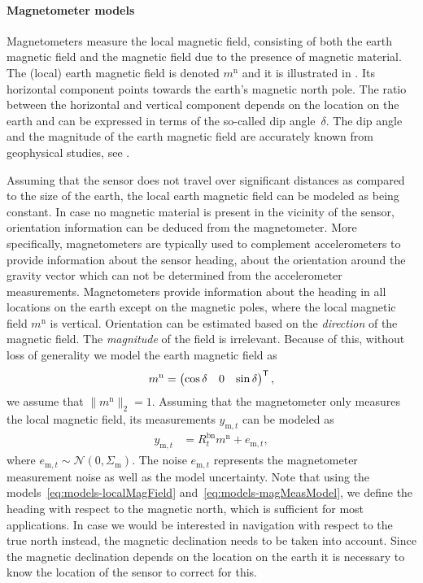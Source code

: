 \paragraph{Magnetometer models}
Magnetometers measure the local magnetic field, consisting of both the earth magnetic field and the magnetic field due to the presence of magnetic material. The (local) earth magnetic field is denoted $m^\text{n}$ and it is illustrated in . Its horizontal component points towards the earth's magnetic north pole. The ratio between the horizontal and vertical component depends on the location on the earth and can be expressed in terms of the so-called dip angle~$\delta$. The dip angle and the magnitude of the earth magnetic field are accurately known from geophysical studies, see \eg \cite{ncei-tutorial}. 

Assuming that the sensor does not travel over significant distances as compared to the size of the earth, the local earth magnetic field can be modeled as being constant. In case no magnetic material is present in the vicinity of the sensor, orientation information can be deduced from the magnetometer. More specifically, magnetometers are typically used to complement accelerometers to provide information about the sensor heading, \ie about the orientation around the gravity vector which can not be determined from the accelerometer measurements. Magnetometers provide information about the heading in all locations on the earth except on the magnetic poles, where the local magnetic field $m^\text{n}$ is vertical. Orientation can be estimated based on the \emph{direction} of the magnetic field. The \emph{magnitude} of the field is irrelevant. Because of this, without loss of generality we model the earth magnetic field as 
\begin{align}
\label{eq:models-localMagField}
m^\text{n}  = \begin{pmatrix} \cos \delta & 0 & \sin \delta \end{pmatrix}^{\mathsf{T}},
\end{align}
\ie we assume that $\| m^\text{n} \|_2 = 1$. Assuming that the magnetometer only measures the local magnetic field, its measurements $y_{\text{m},t}$ can be modeled as
\begin{align}
\label{eq:models-magMeasModel}
y_{\text{m},t} &= R^\text{bn}_t m^\text{n} + e_{\text{m},t}, 
\end{align}
where $e_{\text{m},t} \sim \mathcal{N}(0,\Sigma_\text{m})$. The noise $e_{\text{m},t}$ represents the magnetometer measurement noise as well as the model uncertainty. Note that using the models~\eqref{eq:models-localMagField} and~\eqref{eq:models-magMeasModel}, we define the heading with respect to the magnetic north, which is sufficient for most applications. In case we would be interested in navigation with respect to the true north instead, the magnetic declination needs to be taken into account. Since the magnetic declination depends on the location on the earth it is necessary to know the location of the sensor to correct for this. 

